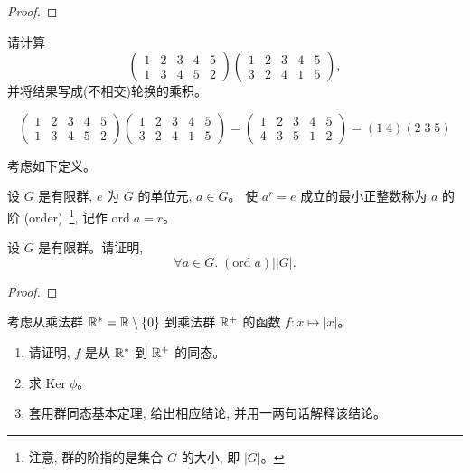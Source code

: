 \documentclass[a4paper, justified]{tufte-handout}
\begin{document}
\begin{proof}
\end{proof}

\begin{problem}
  请计算
  \[
    \begin{pmatrix}
      1 & 2 & 3 & 4 & 5 \\
      1 & 3 & 4 & 5 & 2
    \end{pmatrix}
    \begin{pmatrix}
      1 & 2 & 3 & 4 & 5 \\
      3 & 2 & 4 & 1 & 5
    \end{pmatrix},
  \]
  并将结果写成(不相交)轮换的乘积。
\end{problem}

\begin{solution}
  \[
    \begin{pmatrix}
      1 & 2 & 3 & 4 & 5 \\
      1 & 3 & 4 & 5 & 2
    \end{pmatrix}
    \begin{pmatrix}
      1 & 2 & 3 & 4 & 5 \\
      3 & 2 & 4 & 1 & 5
    \end{pmatrix} =
    \begin{pmatrix}
      1 & 2 & 3 & 4 & 5 \\
      4 & 3 & 5 & 1 & 2
    \end{pmatrix}
    = (1\; 4) (2\; 3\; 5)
  \]
\end{solution}

\begin{problem}
  考虑如下定义。
  \begin{definition}[元素的阶]
    设 $G$ 是有限群, $e$ 为 $G$ 的单位元, $a \in G$。
    使 $a^{r} = e$ 成立的最小正整数称为 $a$ 的阶
    (order)~\footnote{注意, 群的阶指的是集合 $G$ 的大小, 即 $|G|$。},
    记作 $\text{ord}\; a = r$。
  \end{definition}
  设 $G$ 是有限群。请证明,
  \[
    \forall a \in G.\; (\text{ord}\; a) \big\vert |G|.
  \]
\end{problem}

\begin{proof}
\end{proof}

\begin{problem}[\score{5 = 2 + 1 + 2} $\star\star\star$]
  考虑从乘法群 $\mathbb{R}^{\ast} = \mathbb{R} \setminus \{0\}$
  到乘法群 $\mathbb{R}^{+}$ 的函数 $f: x \mapsto |x|$。
  \begin{enumerate}[(1)]
    \item 请证明, $f$ 是从 $\mathbb{R}^{\ast}$ 到 $\mathbb{R}^{+}$ 的同态。
    \item 求 $\text{Ker}\; \phi$。
    \item 套用群同态基本定理, 给出相应结论, 并用一两句话解释该结论。
  \end{enumerate}
\end{problem}
\end{document}

